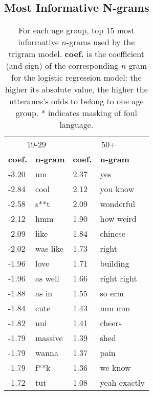 \subsection{Most Informative N-grams}

\begin{table}[H]
    \centering
    \begin{tabular}{@{}l l @{\hspace*{25pt}} l l@{}}
    \toprule
    \multicolumn{2}{c}{19-29} & \multicolumn{2}{c}{50+}\\
    \textbf{coef.} & \textbf{n-gram} & \textbf{coef.} & \textbf{n-gram}\\
    \midrule
    -3.20 & um & 2.37 & yes\\
    -2.84 & cool & 2.12 & you know\\
    -2.58 & s**t & 2.09 & wonderful\\
    -2.12 & hmm & 1.90 & how weird\\
    -2.09 & like & 1.84 & chinese\\
    -2.02 & was like & 1.73 & right\\
    -1.96 & love & 1.71 & building\\
    -1.96 & as well & 1.66 & right right\\
    -1.88 & as in & 1.55 & so erm\\
    -1.84 & cute & 1.43 & mm mm\\
    -1.82 & uni & 1.41 & cheers\\
    -1.79 & massive & 1.39 & shed\\
    -1.79 & wanna & 1.37 & pain\\
    -1.79 & f**k & 1.36 & we know\\
    -1.72 & tut & 1.08 & yeah exactly\\
    \bottomrule
    \end{tabular}
    \vspace{3mm}
    \caption{ For each age group, top 15 most informative $n$-grams used by the trigram model. \textbf{coef.} is the coefficient (and sign) of the corresponding $n$-gram for the logistic regression model: the higher its absolute value, the higher the utterance's odds to belong to one age group.
    * indicates masking of foul language.}
    \label{tab:top_ngrams_ws}
\end{table}


